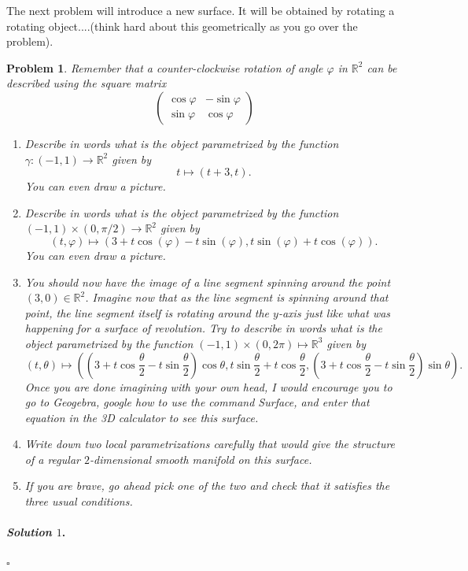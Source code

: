 \documentclass[reqno]{amsart}
\theoremstyle{plain}
\newtheorem{problem}{Problem}
\theoremstyle{definition}
\newenvironment{solution1}{\paragraph{\emph{Solution $1$}.}}{\hfill$\square$}
\begin{document}
The next problem will introduce a new surface.  It will be obtained by rotating a rotating object....(think hard about this geometrically as you go over the problem).
\begin{problem}
Remember that a counter-clockwise rotation of angle $\varphi$ in $\mathbb{R}^{2}$ can be described using the square matrix
\begin{equation*}
\begin{pmatrix}
\cos \varphi & - \sin \varphi \\
\sin \varphi & \cos \varphi
\end{pmatrix}
\end{equation*}
\begin{enumerate}
\item Describe in words what is the object parametrized by the function $\gamma:(-1,1) \rightarrow \mathbb{R}^{2}$ given by 
$$t \mapsto (t+3,t).$$  
You can even draw a picture.
\item Describe in words what is the object parametrized by the function $(-1,1) \times (0,\pi/2) \rightarrow \mathbb{R}^{2}$ given by 
$$(t, \varphi)  \mapsto (3 + t \cos(\varphi) - t\sin(\varphi), t \sin(\varphi) + t \cos(\varphi)).$$  
You can even draw a picture.
\item You should now have the image of a line segment spinning around the point $(3,0) \in \mathbb{R}^{2}$.  Imagine now that as the line segment is spinning around that point, the line segment itself is rotating around the $y$-axis just like what was happening for a surface of revolution.  Try to describe in words what is the object parametrized by the function $(-1,1) \times (0,2\pi) \mapsto \mathbb{R}^{3}$ given by
$$(t,\theta) \mapsto \left(\left(3 + t \cos\frac{\theta}{2} - t \sin \frac{\theta}{2}\right)\cos \theta,t \sin \frac{\theta}{2} + t \cos \frac{\theta}{2},\left(3 + t \cos\frac{\theta}{2} - t \sin \frac{\theta}{2}\right)\sin \theta\right). $$
Once you are done imagining with your own head, I would encourage you to go to Geogebra, google how to use the command Surface, and enter that equation in the 3D calculator to see this surface.
\item Write down two local parametrizations carefully that would give the structure of a regular $2$-dimensional smooth manifold on this surface.
\item If you are brave, go ahead pick one of the two and check that it satisfies the three usual conditions.
\end{enumerate}
\end{problem}
\begin{solution1}

\end{solution1}
\end{document}
